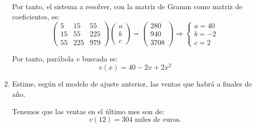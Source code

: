 \begin{ejercicio}
\begin{enumerate}
        Por tanto, el sistema a resolver, con la matriz de Gramm como matriz de coeficientes, es:
        \begin{equation*}
            \left(\begin{array}{ccc}
                5 & 15 & 55\\
                15 & 55 & 225 \\
                55 & 225 & 979
            \end{array}\right)
            \left(\begin{array}{c}
                a \\ b \\ c    
            \end{array}\right)
            = 
            \left(\begin{array}{c}
                280 \\ 940  \\ 3708  
            \end{array}\right)
            \Longrightarrow
            \left\{\begin{array}{c}
                a = 40  \\
                b = -2 \\
                c=2
            \end{array}\right.
        \end{equation*}
    
        Por tanto, parábola $v$ buscada es:
        \begin{equation*}
            v(x)=40-2x+2x^2
        \end{equation*}

        \item Estime, según el modelo de ajuste anterior, las ventas que habrá a finales de año.

        Tenemos que las ventas en el último mes son de:
        \begin{equation*}
            v(12)=304 \text{ miles de euros}.
        \end{equation*}
    \end{enumerate}
\end{ejercicio}

